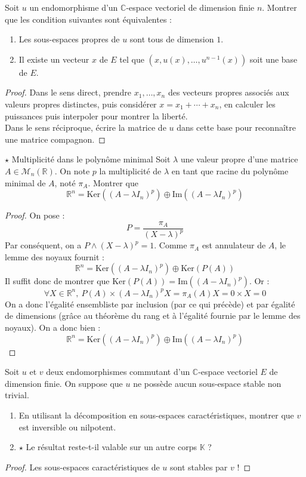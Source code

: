 \documentclass[french,a4paper]{article}
\newcommand{\R}{\mathbb{R}}
\newcommand{\C}{\mathbb{C}}
\newcommand{\K}{\mathbb{K}}
\renewcommand{\ker}{\text{Ker}}
\newcommand{\im}{\text{Im}}
\theoremstyle{plain}
\theoremstyle{definition}
\theoremstyle{remark}
\begin{document}
\begin{ex}{}
	Soit $u$ un endomorphisme d'un $\C$-espace vectoriel de dimension finie $n$. Montrer que les condition suivantes sont équivalentes :
	\begin{enumerate}[label=(\roman*)]
		\item Les sous-espaces propres de $u$ sont tous de dimension $1$.
		\item Il existe un vecteur $x$ de $E$ tel que $(x,u(x),\ldots,u^{n-1}(x))$ soit une base de $E$.
	\end{enumerate}
\end{ex}
\begin{proof}
	Dans le sens direct, prendre $x_1,\ldots,x_n$ des vecteurs propres associés aux valeurs propres distinctes, puis considérer $x=x_1+\cdots+x_n$, en calculer les puissances puis interpoler pour montrer la liberté. \\
	Dans le sens réciproque, écrire la matrice de $u$ dans cette base pour reconnaître une matrice compagnon.
\end{proof}

\begin{ex}{$\star$ Multiplicité dans le polynôme minimal}
	Soit $\lambda$ une valeur propre d'une matrice $A\in\mathcal{M}_n(\R)$. On note $p$ la multiplicité de $\lambda$ en tant que racine du polynôme minimal de $A$, noté $\pi_A$. Montrer que $$\R^n=\ker((A-\lambda I_n)^p)\oplus\im((A-\lambda I_n)^p)$$ 
\end{ex}
\begin{proof}
	On pose : $$P=\frac{\pi_A}{(X-\lambda)^p}$$ Par conséquent, on a $P\wedge(X-\lambda)^p=1$. Comme $\pi_A$ est annulateur de $A$, le lemme des noyaux fournit : $$\R^n=\ker((A-\lambda I_n)^p)\oplus\ker(P(A))$$ Il suffit donc de montrer que $\ker(P(A))=\im((A-\lambda I_n)^p)$. Or : $$\forall X\in\R^n,\ P(A)\times(A-\lambda I_n)^pX=\pi_A(A)X=0\times X=0$$ On a donc l'égalité ensembliste par inclusion (par ce qui précède) et par égalité de dimensions (grâce au théorème du rang et à l'égalité fournie par le lemme des noyaux). On a donc bien :$$\R^n=\ker((A-\lambda I_n)^p)\oplus\im((A-\lambda I_n)^p)$$ 
\end{proof}

\begin{ex}{}
	Soit $u$ et $v$ deux endomorphismes commutant d'un $\C$-espace vectoriel $E$ de dimension finie. On suppose que $u$ ne possède aucun sous-espace stable non trivial.
	\begin{enumerate}
		\item En utilisant la décomposition en sous-espaces caractéristiques, montrer que $v$ est inversible ou nilpotent.
		\item $\star$ Le résultat reste-t-il valable sur un autre corps $\K$ ?
	\end{enumerate}
\end{ex}
\begin{proof}
	Les sous-espaces caractéristiques de $u$ sont stables par $v$ !
\end{proof}
\end{document}
